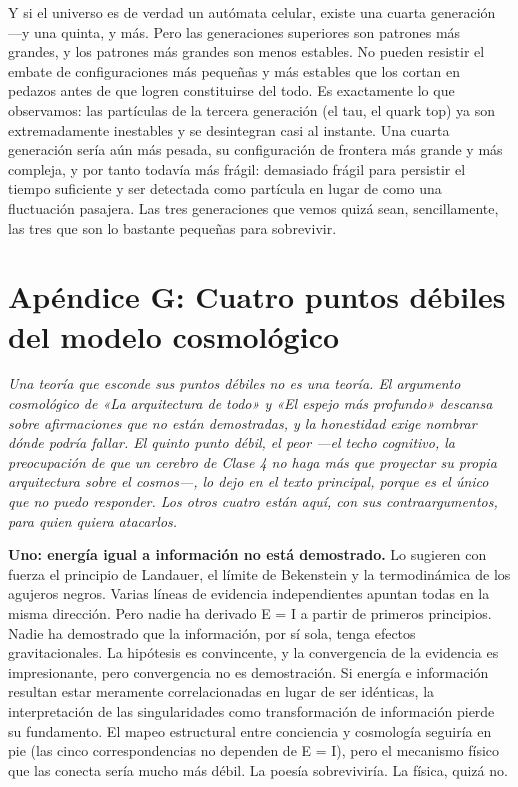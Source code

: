 \documentclass[11pt, twoside, openright]{book}
\begin{document}
Y si el universo es de verdad un autómata celular, existe una cuarta generación ---y una quinta, y más. Pero las generaciones superiores son patrones más grandes, y los patrones más grandes son menos estables. No pueden resistir el embate de configuraciones más pequeñas y más estables que los cortan en pedazos antes de que logren constituirse del todo. Es exactamente lo que observamos: las partículas de la tercera generación (el tau, el quark top) ya son extremadamente inestables y se desintegran casi al instante. Una cuarta generación sería aún más pesada, su configuración de frontera más grande y más compleja, y por tanto todavía más frágil: demasiado frágil para persistir el tiempo suficiente y ser detectada como partícula en lugar de como una fluctuación pasajera. Las tres generaciones que vemos quizá sean, sencillamente, las tres que son lo bastante pequeñas para sobrevivir.


\chapter*{Apéndice G: Cuatro puntos débiles del modelo cosmológico}

\textit{Una teoría que esconde sus puntos débiles no es una teoría. El argumento cosmológico de «La arquitectura de todo» y «El espejo más profundo» descansa sobre afirmaciones que no están demostradas, y la honestidad exige nombrar dónde podría fallar. El quinto punto débil, el peor ---el techo cognitivo, la preocupación de que un cerebro de Clase 4 no haga más que proyectar su propia arquitectura sobre el cosmos---, lo dejo en el texto principal, porque es el único que no puedo responder. Los otros cuatro están aquí, con sus contraargumentos, para quien quiera atacarlos.}

\textbf{Uno: energía igual a información no está demostrado.} Lo sugieren con fuerza el principio de Landauer, el límite de Bekenstein y la termodinámica de los agujeros negros. Varias líneas de evidencia independientes apuntan todas en la misma dirección. Pero nadie ha derivado E = I a partir de primeros principios. Nadie ha demostrado que la información, por sí sola, tenga efectos gravitacionales. La hipótesis es convincente, y la convergencia de la evidencia es impresionante, pero convergencia no es demostración. Si energía e información resultan estar meramente correlacionadas en lugar de ser idénticas, la interpretación de las singularidades como transformación de información pierde su fundamento. El mapeo estructural entre conciencia y cosmología seguiría en pie (las cinco correspondencias no dependen de E = I), pero el mecanismo físico que las conecta sería mucho más débil. La poesía sobreviviría. La física, quizá no.
\end{document}

